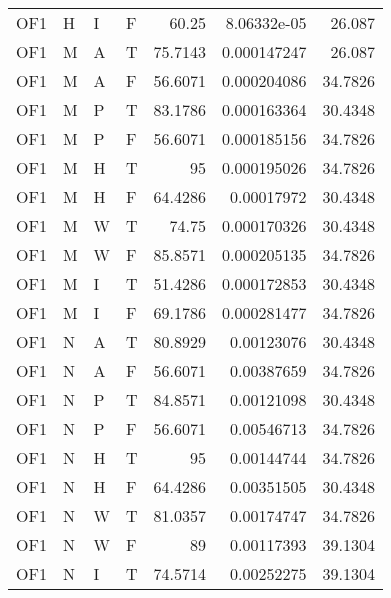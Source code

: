 \begin{longtable}{llllrrr}
    OF1      & H         & I         & F          & 60.25      & 8.06332e-05 & 26.087   \\
    OF1      & M         & A         & T          & 75.7143    & 0.000147247 & 26.087   \\
    OF1      & M         & A         & F          & 56.6071    & 0.000204086 & 34.7826  \\
    OF1      & M         & P         & T          & 83.1786    & 0.000163364 & 30.4348  \\
    OF1      & M         & P         & F          & 56.6071    & 0.000185156 & 34.7826  \\
    OF1      & M         & H         & T          & 95         & 0.000195026 & 34.7826  \\
    OF1      & M         & H         & F          & 64.4286    & 0.00017972  & 30.4348  \\
    OF1      & M         & W         & T          & 74.75      & 0.000170326 & 30.4348  \\
    OF1      & M         & W         & F          & 85.8571    & 0.000205135 & 34.7826  \\
    OF1      & M         & I         & T          & 51.4286    & 0.000172853 & 30.4348  \\
    OF1      & M         & I         & F          & 69.1786    & 0.000281477 & 34.7826  \\
    OF1      & N         & A         & T          & 80.8929    & 0.00123076  & 30.4348  \\
    OF1      & N         & A         & F          & 56.6071    & 0.00387659  & 34.7826  \\
    OF1      & N         & P         & T          & 84.8571    & 0.00121098  & 30.4348  \\
    OF1      & N         & P         & F          & 56.6071    & 0.00546713  & 34.7826  \\
    OF1      & N         & H         & T          & 95         & 0.00144744  & 34.7826  \\
    OF1      & N         & H         & F          & 64.4286    & 0.00351505  & 30.4348  \\
    OF1      & N         & W         & T          & 81.0357    & 0.00174747  & 34.7826  \\
    OF1      & N         & W         & F          & 89         & 0.00117393  & 39.1304  \\
    OF1      & N         & I         & T          & 74.5714    & 0.00252275  & 39.1304  \\

\end{longtable}
